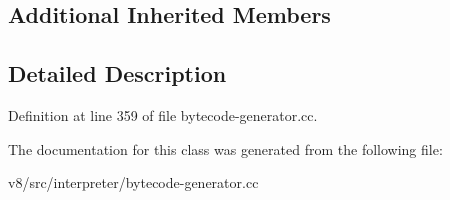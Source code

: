 \subsection*{Additional Inherited Members}


\subsection{Detailed Description}


Definition at line 359 of file bytecode-\/generator.\+cc.



The documentation for this class was generated from the following file\+:\begin{DoxyCompactItemize}
\item 
v8/src/interpreter/bytecode-\/generator.\+cc\end{DoxyCompactItemize}
